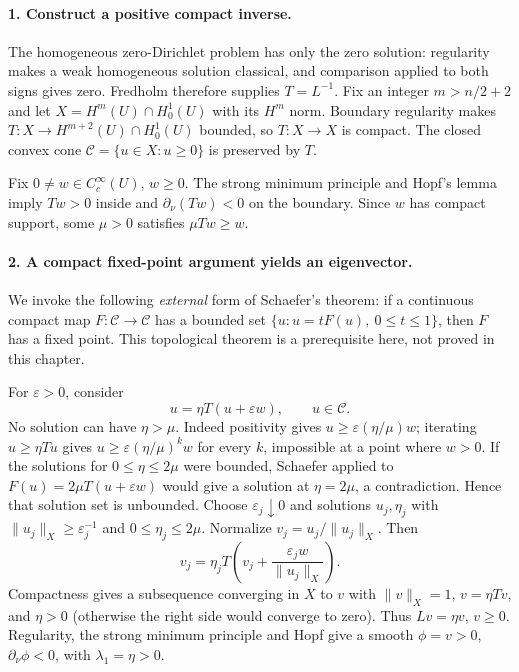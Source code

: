 \begin{expandedproof}
\paragraph{1. Construct a positive compact inverse.}
The homogeneous zero-Dirichlet problem has only the zero solution:
regularity makes a weak homogeneous solution classical, and comparison
applied to both signs gives zero. Fredholm therefore supplies $T=L^{-1}$.
Fix an integer $m>n/2+2$ and let $X=H^m(U)\cap H^1_0(U)$ with its $H^m$
norm. Boundary regularity makes $T:X\to H^{m+2}(U)\cap H^1_0(U)$ bounded,
so $T:X\to X$ is compact.
The closed convex cone $\mathcal C=\{u\in X:u\geq0\}$ is preserved by $T$.

Fix $0\ne w\in C^\infty_c(U)$, $w\geq0$.
The strong minimum principle and Hopf's lemma imply
$Tw>0$ inside and $\partial_\nu(Tw)<0$ on the boundary.
Since $w$ has compact support, some $\mu>0$ satisfies $\mu Tw\geq w$.

\paragraph{2. A compact fixed-point argument yields an eigenvector.}
We invoke the following \emph{external} form of Schaefer's theorem:
if a continuous compact map $F:\mathcal C\to\mathcal C$ has a bounded
set $\{u:u=tF(u),\ 0\leq t\leq1\}$, then $F$ has a fixed point.
This topological theorem is a prerequisite here, not proved in this chapter.

For $\varepsilon>0$, consider
\[
 u=\eta T(u+\varepsilon w),\qquad u\in\mathcal C.
\]
No solution can have $\eta>\mu$. Indeed positivity gives
$u\geq\varepsilon(\eta/\mu)w$; iterating $u\geq\eta Tu$ gives
$u\geq\varepsilon(\eta/\mu)^kw$ for every $k$, impossible at a point
where $w>0$.
If the solutions for $0\leq\eta\leq2\mu$ were bounded, Schaefer applied
to $F(u)=2\mu T(u+\varepsilon w)$ would give a solution at $\eta=2\mu$,
a contradiction. Hence that solution set is unbounded.
Choose $\varepsilon_j\downarrow0$ and solutions $u_j,\eta_j$ with
$\|u_j\|_X\geq\varepsilon_j^{-1}$ and $0\leq\eta_j\leq2\mu$.
Normalize $v_j=u_j/\|u_j\|_X$. Then
\[
 v_j=\eta_j T\left(v_j+\frac{\varepsilon_jw}{\|u_j\|_X}\right).
\]
Compactness gives a subsequence converging in $X$ to $v$ with
$\|v\|_X=1$, $v=\eta Tv$, and $\eta>0$ (otherwise the right side
would converge to zero). Thus $Lv=\eta v$, $v\geq0$.
Regularity, the strong minimum principle and Hopf give a smooth
$\phi=v>0$, $\partial_\nu\phi<0$, with $\lambda_1=\eta>0$.


\end{expandedproof}
